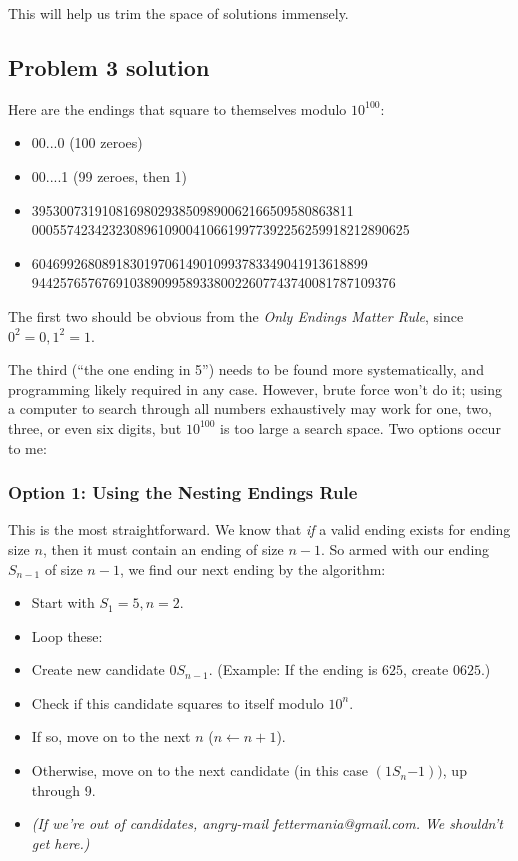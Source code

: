 \documentclass[11pt, oneside]{article} 	%
\begin{document}
This will help us trim the space of solutions immensely.

\subsection{Problem 3 solution}

Here are the endings that square to themselves modulo $10^{100}$:
\begin{itemize}
\item  00...0 (100 zeroes)
\item  00....1 (99 zeroes, then 1)
\item 3953007319108169802938509890062166509580863811 \\ 
000557423423230896109004106619977392256259918212890625
\item 604699268089183019706149010993783349041913618899 \\
9442576576769103890995893380022607743740081787109376
\end{itemize}

The first two should be obvious from the \emph{Only Endings Matter Rule}, since $0^2 = 0, 1^2=1$.  

The third (``the one ending in 5'') needs to be found more systematically, and programming likely required in any case.  However, brute force won't do it; using a computer to search through all numbers exhaustively may work for one, two, three, or even six digits, but $10^{100}$ is too large a search space.  Two options occur to me:

\subsubsection{Option 1: Using the Nesting Endings Rule}

This is the most straightforward.  We know that \emph{if} a valid ending exists for ending size $n$, then it must contain an ending of size $n-1$.  So armed with our ending $S_{n-1}$ of size $n-1$, we find our next ending by the algorithm:
\begin{itemize}
\item Start with $S_1 = 5, n = 2$.
\item Loop these: 
\item Create new candidate $0S_{n-1}$.  (Example: If the ending is $625$, create $0625$.)
\item Check if this candidate squares to itself modulo $10^n$.  
\item If so, move on to the next $n$ ($n \leftarrow n + 1$).
\item Otherwise, move on to the next candidate (in this case $(1S_n{-1}))$, up through 9.
\item \emph{(If we're out of candidates, angry-mail fettermania@gmail.com.  We shouldn't get here.)}
\end{itemize}
\end{document}
